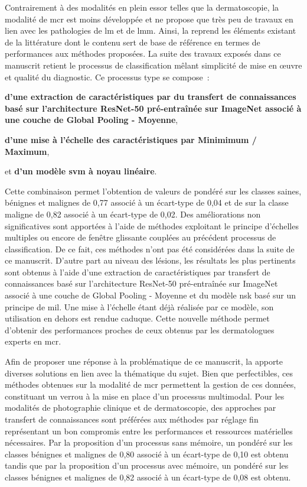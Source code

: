 Contrairement à des modalités en plein essor telles que la dermatoscopie, la modalité de \gls{mcr} est moins développée et ne propose que très peu de travaux en lien avec les pathologies de \gls{lm} et de \gls{lmm}. Ainsi, la  reprend les éléments existant de la littérature dont le contenu sert de base de référence en termes de performances aux méthodes proposées. La suite des travaux exposés dans ce manuscrit retient le processus de classification mêlant simplicité de mise en œuvre et qualité du diagnostic. Ce processus type se compose~:
\begin{inlinerate}
    \item \textbf{d'une extraction de caractéristiques par du transfert de connaissances basé sur l'architecture ResNet-50 pré-entraînée sur ImageNet associé à une couche de Global Pooling - Moyenne},
    \item \textbf{d'une mise à l'échelle des caractéristiques par Minimimum / Maximum},
    \item et \textbf{d'un modèle \gls{svm} à noyau linéaire}.
\end{inlinerate} Cette combinaison permet l'obtention de valeurs de \fscore{} pondéré sur les classes saines, bénignes et malignes de 0,77 associé à un écart-type de 0,04 et de \fscore{} sur la classe maligne de 0,82 associé à un écart-type de 0,02. Des améliorations non significatives sont apportées à l'aide de méthodes exploitant le principe d'échelles multiples ou encore de fenêtre glissante couplées au précédent processus de classification. De ce fait, ces méthodes n'ont pas été considérées dans la suite de ce manuscrit. D'autre part au niveau des lésions, les résultats les plus pertinents sont obtenus à l'aide d'une extraction de caractéristiques par transfert de connaissances basé sur l'architecture ResNet-50 pré-entraînée sur ImageNet associé à une couche de Global Pooling - Moyenne et du modèle \gls{nsk} basé sur un principe de \gls{mil}. Une mise à l'échelle étant déjà réalisée par ce modèle, son utilisation en dehors est rendue caduque. Cette nouvelle méthode permet d'obtenir des performances proches de ceux obtenus par les dermatologues experts en \gls{mcr}.\par

Afin de proposer une réponse à la problématique de ce manuscrit, la  apporte diverses solutions en lien avec la thématique du sujet. Bien que perfectibles, ces méthodes obtenues sur la modalité de \gls{mcr} permettent la gestion de ces données, constituant un verrou à la mise en place d'un processus multimodal. Pour les modalités de photographie clinique et de dermatoscopie, des approches par transfert de connaissances sont préférées aux méthodes par réglage fin représentant un bon compromis entre les performances et ressources matérielles nécessaires. Par la proposition d'un processus sans mémoire, un \fscore{} pondéré sur les classes bénignes et malignes de 0,80 associé à un écart-type de 0,10 est obtenu tandis que par la proposition d'un processus avec mémoire, un \fscore{} pondéré sur les classes bénignes et malignes de 0,82 associé à un écart-type de 0,08 est obtenu.\par

